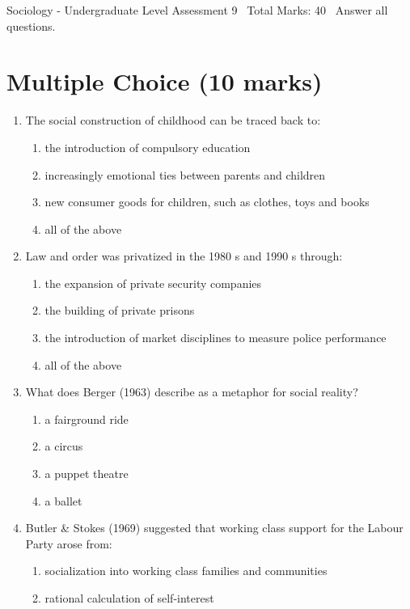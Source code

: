 \documentclass[12pt]{article}
\begin{document}
\begin{center}
Sociology - Undergraduate Level Assessment 9 \
Total Marks: 40 \
Answer all questions.
\end{center}

\section*{Multiple Choice (10 marks)}
\begin{enumerate}[label=\arabic*.]
\item The social construction of childhood can be traced back to:
\begin{enumerate}[label=(\alph*)]
    \item the introduction of compulsory education
    \item increasingly emotional ties between parents and children
    \item new consumer goods for children, such as clothes, toys and books
    \item all of the above
\end{enumerate}
\item Law and order was privatized in the 1980 s and 1990 s through:
\begin{enumerate}[label=(\alph*)]
    \item the expansion of private security companies
    \item the building of private prisons
    \item the introduction of market disciplines to measure police performance
    \item all of the above
\end{enumerate}
\item What does Berger (1963) describe as a metaphor for social reality?
\begin{enumerate}[label=(\alph*)]
    \item a fairground ride
    \item a circus
    \item a puppet theatre
    \item a ballet
\end{enumerate}
\item Butler \& Stokes (1969) suggested that working class support for the Labour Party arose from:
\begin{enumerate}[label=(\alph*)]
    \item socialization into working class families and communities
    \item rational calculation of self-interest

\end{enumerate}
\end{enumerate}
\end{document}
